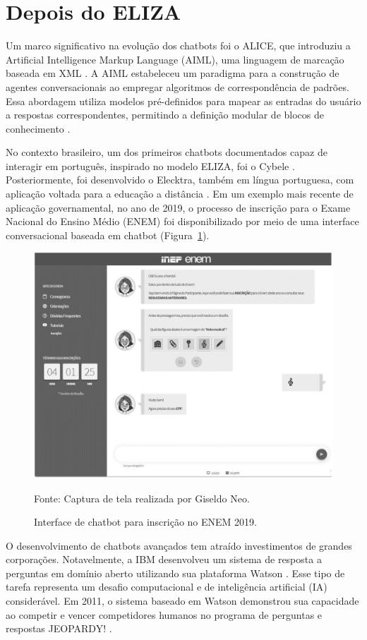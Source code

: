 \documentclass[14pt,a4paper,oneside]{book}
\begin{document}
\section{Depois do ELIZA}

Um marco significativo na evolução dos chatbots foi o ALICE, que introduziu a Artificial Intelligence Markup Language (AIML), uma linguagem de marcação baseada em XML \cite{Wallace2000}. A AIML estabeleceu um paradigma para a construção de agentes conversacionais ao empregar algoritmos de correspondência de padrões. Essa abordagem utiliza modelos pré-definidos para mapear as entradas do usuário a respostas correspondentes, permitindo a definição modular de blocos de conhecimento \cite{Wallace2000}.

No contexto brasileiro, um dos primeiros chatbots documentados capaz de interagir em português, inspirado no modelo ELIZA, foi o Cybele \cite{primo2001chatterbot}. Posteriormente, foi desenvolvido o Elecktra, também em língua portuguesa, com aplicação voltada para a educação a distância \cite{Leonhardt2003}. Em um exemplo mais recente de aplicação governamental, no ano de 2019, o processo de inscrição para o Exame Nacional do Ensino Médio (ENEM) foi disponibilizado por meio de uma interface conversacional baseada em chatbot (Figura~\ref{fig:enem}).

\begin{figure}
	\centering
	\caption{Interface de chatbot para inscrição no ENEM 2019.}
	\includegraphics[width=0.5\linewidth]{fig/enem.png}
	\label{fig:enem}
	{\footnotesize 
	
	Fonte: Captura de tela realizada por Giseldo Neo.}
\end{figure}

O desenvolvimento de chatbots avançados tem atraído investimentos de grandes corporações. Notavelmente, a IBM desenvolveu um sistema de resposta a perguntas em domínio aberto utilizando sua plataforma Watson \cite{Ferrucci2012}. Esse tipo de tarefa representa um desafio computacional e de inteligência artificial (IA) considerável. Em 2011, o sistema baseado em Watson demonstrou sua capacidade ao competir e vencer competidores humanos no programa de perguntas e respostas JEOPARDY! \cite{Ferrucci2012}.
\end{document}
